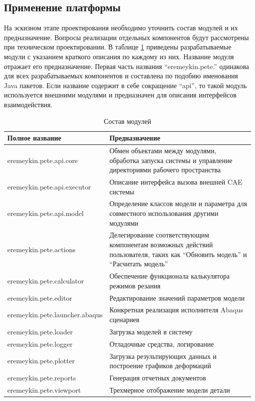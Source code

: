 \documentclass[14pt,oneside,final]{extreport}
\begin{document}
	\subsection{Применение платформы}	
	На эскизном этапе проектирования необходимо уточнить состав модулей и их предназначение. Вопросы реализации отдельных компонентов будут рассмотрены при техническом проектировании. В таблице \ref{tab:modules} приведены разрабатываемые модули с указанием краткого описания по каждому из них. Название модуля отражает его предназначение. Первая часть названия ``eremeykin.pete.'' 	одинакова для всех разрабатываемых компонентов и составлена по подобию именования Java пакетов. Если название содержит в себе сокращение ``api'', то такой модуль используется внешними модулями и предназначен для описания интерфейсов взаимодействия. 
		\begin{longtable}{| p{} | p{} |}
			\caption{Состав модулей}\label{tab:modules} \\
			\hline Полное название & Предназначение \\ 
			\hline eremeykin.pete.api.core & Обмен объектами между модулями, обработка запуска системы и управление директориями рабочего пространства \\ 
			\hline eremeykin.pete.api.executor & Описание интерфейса вызова внешней CAE системы \\ 
			\hline eremeykin.pete.api.model & Определение классов модели и параметра для совместного использования другими модулями\\ 
			\hline eremeykin.pete.actions & Делегирование соответствующим компонентам возможных действий пользователя, таких как ``Обновить модель'' и ``Расчитать модель'' \\ 
			\hline eremeykin.pete.calculator & Обеспечение функционала калькулятора режимов резания \\ 
			\hline eremeykin.pete.editor & Редактирование значений параметров модели  \\ 
			\hline eremeykin.pete.launcher.abaqus & Конкретная реализация исполнителя Abaqus сценариев \\ 
			\hline eremeykin.pete.loader & Загрузка моделей в систему\\ 
			\hline eremeykin.pete.logger & Отладочные средства, логирование\\ 			
			\hline eremeykin.pete.plotter & Загрузка результирующих данных и построение графиков деформаций \\ 			
			\hline eremeykin.pete.reports & Генерация отчетных документов\\ 			
			\hline eremeykin.pete.viewport & Трехмерное отображение модели детали \\ 			
			\hline 
		\end{longtable}
\end{document}
